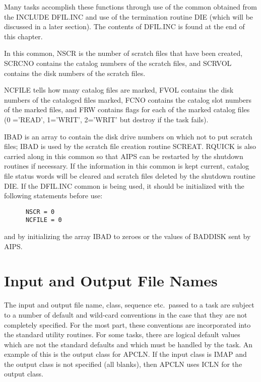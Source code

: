 Many tasks accomplish these functions through use of the common
obtained from the INCLUDE DFIL.INC and use of the termination routine
DIE (which will be discussed in a later section).  The contents of
DFIL.INC is found at the end of this chapter.

In this common, NSCR is the number of scratch files that have been
created, SCRCNO contains the catalog numbers of the scratch files, and
SCRVOL contains the disk numbers of the scratch files.

NCFILE tells how many catalog files are marked, FVOL contains the disk
numbers of the cataloged files marked, FCNO contains the catalog slot
numbers of the marked files, and FRW contains flags for each of the
marked catalog files (0 ='READ', 1='WRIT', 2='WRIT' but destroy if the
task fails).

IBAD is an array to contain the disk drive numbers on which not to put
scratch files; IBAD is used by the scratch file creation routine
SCREAT.  RQUICK is also carried along in this common so that AIPS can
be restarted by the shutdown routines if necessary. If the information
in this common is kept current, catalog file status words will be
cleared and scratch files deleted by the shutdown routine DIE.  If
the DFIL.INC common is being used, it should be initialized with the
following statements before use:
\begin{verbatim}
      NSCR = 0
      NCFILE = 0

\end{verbatim}
and by initializing the array IBAD to zeroes or the values of BADDISK
sent by AIPS.

\section{Input and Output File Names}
 The input and output file name, class, sequence etc.~passed to a task
are subject to a number of default and wild-card conventions in the
case that they are not completely specified.  For the most part, these
conventions are incorporated into the standard utility routines.  For
some tasks, there are logical default values which are not the
standard defaults and which must be handled by the task.  An example
of this is the output class for APCLN.  If the input class is IMAP and
the output class is not specified (all blanks), then APCLN uses ICLN
for the output class.

